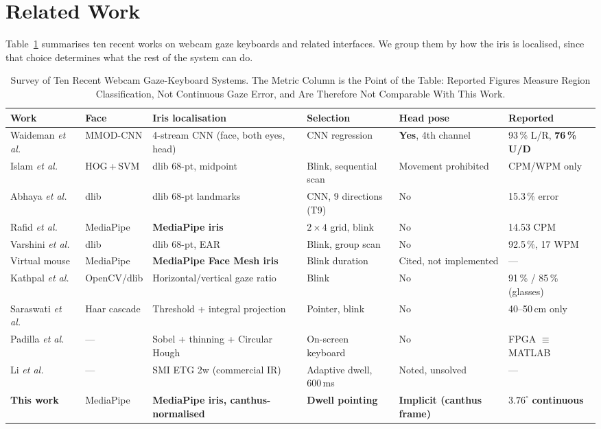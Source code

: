 \documentclass[conference]{IEEEtran}
\begin{document}
\section{Related Work}

Table~\ref{tab:survey} summarises ten recent works on webcam gaze keyboards and
related interfaces. We group them by how the iris is localised, since that
choice determines what the rest of the system can do.

\begin{table}[!tb]
\renewcommand{\arraystretch}{1.25}
\caption{Survey of Ten Recent Webcam Gaze-Keyboard Systems. The Metric Column is
the Point of the Table: Reported Figures Measure Region Classification,
Not Continuous Gaze Error, and Are Therefore Not Comparable With This Work.}
\label{tab:survey}
\centering
\footnotesize
\begin{tabular}{@{}p{2.6cm}p{1.9cm}p{3.2cm}p{3.0cm}p{2.0cm}p{2.4cm}@{}}
\toprule
\textbf{Work} & \textbf{Face} & \textbf{Iris localisation} &
\textbf{Selection} & \textbf{Head pose} & \textbf{Reported} \\
\midrule
Waideman \emph{et al.}~\cite{ref01} & MMOD-CNN & 4-stream CNN (face, both eyes, head) & CNN regression & \textbf{Yes}, 4th channel & 93\,\% L/R, \textbf{76\,\% U/D} \\
Islam \emph{et al.}~\cite{ref02} & HOG\,+\,SVM & dlib 68-pt, midpoint & Blink, sequential scan & Movement prohibited & CPM/WPM only \\
Abhaya \emph{et al.}~\cite{ref03} & dlib & dlib 68-pt landmarks & CNN, 9 directions (T9) & No & 15.3\,\% error \\
Rafid \emph{et al.}~\cite{ref04} & MediaPipe & \textbf{MediaPipe iris} & $2\times4$ grid, blink & No & 14.53 CPM \\
Varshini \emph{et al.}~\cite{ref05} & dlib & dlib 68-pt, EAR & Blink, group scan & No & 92.5\,\%, 17 WPM \\
Virtual mouse~\cite{ref06} & MediaPipe & \textbf{MediaPipe Face Mesh iris} & Blink duration & Cited, not implemented & --- \\
Kathpal \emph{et al.}~\cite{ref07} & OpenCV/dlib & Horizontal/vertical gaze ratio & Blink & No & 91\,\% / 85\,\% (glasses) \\
Saraswati \emph{et al.}~\cite{ref08} & Haar cascade & Threshold + integral projection & Pointer, blink & No & 40--50\,cm only \\
Padilla \emph{et al.}~\cite{ref09} & --- & Sobel + thinning + Circular Hough & On-screen keyboard & No & FPGA $\equiv$ MATLAB \\
Li \emph{et al.}~\cite{ref09b} & --- & SMI ETG 2w (commercial IR) & Adaptive dwell, 600\,ms & Noted, unsolved & --- \\
\midrule
\textbf{This work} & MediaPipe & \textbf{MediaPipe iris, canthus-normalised} & \textbf{Dwell pointing} & \textbf{Implicit (canthus frame)} & $\mathbf{3.76^\circ}$ \textbf{continuous} \\
\bottomrule
\end{tabular}
\end{table}
\end{document}
